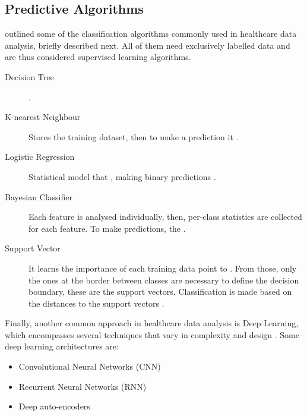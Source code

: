 \documentclass[a4paper,12pt]{article}
\begin{document}
\subsection{Predictive Algorithms}


\textcite{Jothi2015} outlined some of the classification algorithms commonly used in healthcare data analysis, briefly described next. All of them need exclusively labelled data and are thus considered supervised learning algorithms.

\begin{description}
    \item[Decision Tree] .
    \item[K-nearest Neighbour] Stores the training dataset, then to make a prediction it .
    \item[Logistic Regression] Statistical model that , making binary predictions \parencite{Nick2007}.
    \item[Bayesian Classifier] Each feature is analysed individually, then, per-class statistics are collected for each feature. 
    To make predictions, the .
    \item[Support Vector] It learns the importance of each training data point to .
    From those, only the ones at the border between classes are necessary to define the decision boundary, these are the support vectors.
    Classification is made based on the distances to the support vectors \parencite[98]{Mueller2017}.
\end{description}


Finally, another common approach in healthcare data analysis is Deep Learning, which encompasses several techniques that vary in complexity and design \parencite{Ibrahim2021}. Some deep learning architectures are:

\begin{itemize}
 \item Convolutional Neural Networks (CNN)
 \item Recurrent Neural Networks (RNN)
 \item Deep auto-encoders
\end{itemize}
\end{document}
